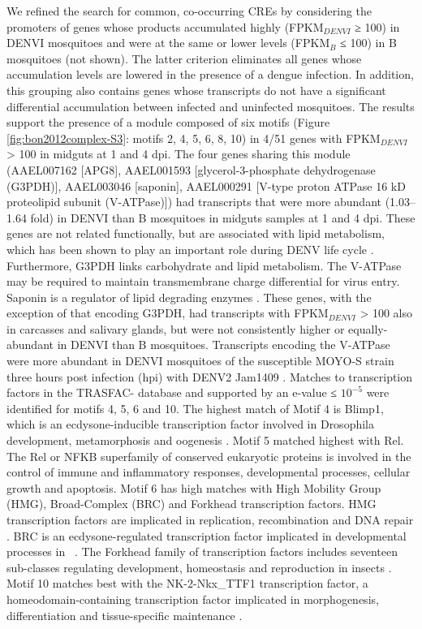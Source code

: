 We refined the search for common, co-occurring \glspl{CRE} by considering the promoters of genes whose products accumulated highly (FPKM$_{DENVI}$ ≥ 100) in \gls{DENVI} mosquitoes and were at the same or lower levels (FPKM$_{B}$ ≤ 100) in B mosquitoes (not shown).
The latter criterion eliminates all genes whose accumulation levels are lowered in the presence of a dengue infection.
In addition, this grouping also contains genes whose transcripts do not have a significant differential accumulation between infected and uninfected mosquitoes.
The results support the presence of a module composed of six motifs (Figure \ref{fig:bon2012complex-S3}: motifs 2, 4, 5, 6, 8, 10) in 4/51 genes with FPKM$_{DENVI}$ > 100 in midguts at 1 and 4 \gls{dpi}.
The four genes sharing this module (AAEL007162 [APG8], AAEL001593 [glycerol-3-phosphate dehydrogenase (G3PDH)], AAEL003046 [saponin], AAEL000291 [V-type proton ATPase 16 kD proteolipid subunit (V-ATPase)]) had transcripts that were more abundant (1.03–1.64 fold) in \gls{DENVI} than B mosquitoes in midguts samples at 1 and 4 \gls{dpi}.
These genes are not related functionally, but are associated with lipid metabolism, which has been shown to play an important role during \gls{DENV} life cycle \cite{Samsa2009}.
Furthermore, G3PDH links carbohydrate and lipid metabolism.
The V-ATPase may be required to maintain transmembrane charge differential for virus entry.
Saponin is a regulator of lipid degrading enzymes \cite{Lindholm2010}.
These genes, with the exception of that encoding G3PDH, had transcripts with FPKM$_{DENVI}$ > 100 also in carcasses and salivary glands, but were not consistently higher or equally-abundant in \gls{DENVI} than B mosquitoes.
Transcripts encoding the V-ATPase were more abundant in \gls{DENVI} mosquitoes of the susceptible MOYO-S strain three hours post infection (hpi) with \gls{DENV}2 Jam1409 \cite{Behura2011}.
Matches to transcription factors in the TRASFAC- database \cite{Matys2006} and supported by an e-value ≤ $10^{-5}$ were identified for motifs 4, 5, 6 and 10.
The highest match of Motif 4 is Blimp1, which is an ecdysone-inducible transcription factor involved in Drosophila development, metamorphosis and oogenesis \cite{Agawa2007}.
Motif 5 matched highest with Rel.
The Rel or \gls{NFKB} superfamily of conserved eukaryotic proteins is involved in the control of immune and inflammatory responses, developmental processes, cellular growth and apoptosis.
Motif 6 has high matches with High Mobility Group (HMG), Broad-Complex (BRC) and Forkhead transcription factors.
HMG transcription factors are implicated in replication, recombination and DNA repair \cite{Rajeswari2002}.
BRC is an ecdysone-regulated transcription factor implicated in developmental processes in \Dm\ \cite{Sandstrom1997}.
The Forkhead family of transcription factors includes seventeen sub-classes regulating development, homeostasis and reproduction in insects \cite{Hansen2007}.
Motif 10 matches best with the NK-2-Nkx\_TTF1 transcription factor, a homeodomain-containing transcription factor implicated in morphogenesis, differentiation and tissue-specific maintenance \cite{Boggaram2009}.

